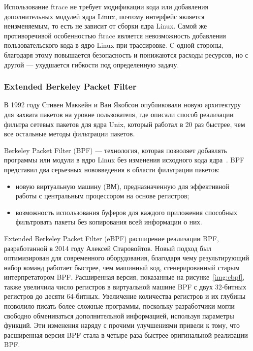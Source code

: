Использование ftrace не требует модификации кода или добавления дополнительных модулей ядра Linux, поэтому интерфейс является неизменяемым, то есть не зависит от сборки ядра Linux. Самой же противоречивой особенностью ftrace является невозможность добавления пользовательского кода в ядро Linux при трассировке. C одной стороны, благодаря этому повышается безопасность и понижаются расходы ресурсов, но с другой --- ухудшается гибкости под определенную задачу.

\subsubsection{Extended Berkeley Packet Filter}

В 1992 году Стивен Маккейн и Ван Якобсон опубликовали новую архитектуру для захвата пакетов на уровне пользователя, где описали способ реализации фильтра сетевых пакетов для ядра Unix, который работал в 20 раз быстрее, чем все остальные методы фильтрации пакетов.

Berkeley Packet Filter (BPF) --- технология, которая позволяет добавлять программы или модули в ядро Linux без изменения исходного кода ядра~\cite{bpf_for_monitoring}.
BPF представил два серьезных нововведения в области фильтрации пакетов:
\begin{itemize}
	\item новую виртуальную машину (ВМ), предназначенную для эффективной работы с центральным процессором на основе регистров;
	\item возможность использования буферов для каждого приложения способных фильтровать пакеты без копирования всей информации о них.
\end{itemize}

Extended Berkeley Packet Filter (eBPF) расширение реализации BPF, разработанной в 2014 году Алексей Старовойтов. Новый подход был оптимизирован для современного оборудования, благодаря чему результирующий набор команд работает быстрее, чем машинный код, сгенерированный старым интерпретатором BPF. 
Расширенная версия, показанные на рисунке~\ref{img:ebpf}, также увеличила число регистров в виртуальной машине BPF с двух 32-битных регистров до десяти 64-битных. Увеличение количества регистров и их глубины позволило писать более сложные программы, поскольку разработчики могли свободно обмениваться дополнительной информацией, используя параметры функций.
Эти изменения наряду с прочими улучшениями привели к тому, что расширенная версия BPF стала в четыре раза быстрее оригинальной реализации BPF.

